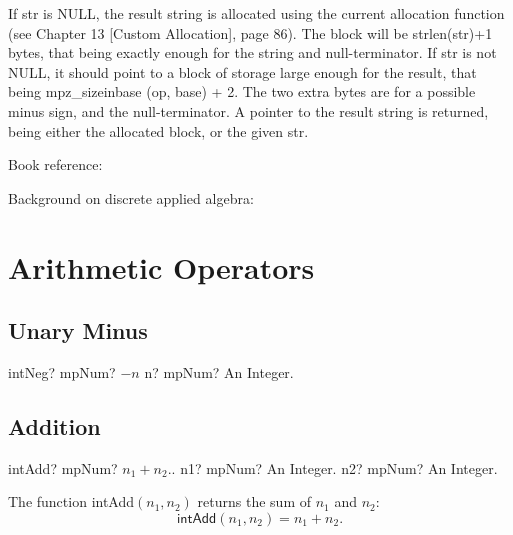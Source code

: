 If str is NULL, the result string is allocated using the current allocation function (see
Chapter 13 [Custom Allocation], page 86). The block will be strlen(str)+1 bytes, that
being exactly enough for the string and null-terminator.
If str is not NULL, it should point to a block of storage large enough for the result, that being
mpz\_sizeinbase (op, base) + 2. The two extra bytes are for a possible minus sign, and the
null-terminator.
A pointer to the result string is returned, being either the allocated block, or the given str.




\label{FunctionsReturningIntegers} 

Book reference: \cite{Shoup2009}

Background on discrete applied algebra: \cite{Hardy_2009}





\section{Arithmetic Operators }
\label{ArithmeticOperatorsInt}



\subsection{Unary Minus}

\begin{mpFunctionsExtract}
	\mpFunctionOne
	{intNeg? mpNum?  $-n$}
	{n? mpNum? An Integer.}
\end{mpFunctionsExtract}



\subsection{Addition}

\begin{mpFunctionsExtract}
	\mpFunctionTwo
	{intAdd? mpNum?  $n_1 + n_2.$.}
	{n1? mpNum? An Integer.}
	{n2? mpNum? An Integer.}
\end{mpFunctionsExtract}

\vspace{0.3cm}
The function \textsf{intAdd$(n_1, n_2)$} returns the sum of $n_1$ and $n_2$: 
\begin{equation}
	\textsf{intAdd}(n_1, n_2) =n_1 + n_2.
\end{equation}



